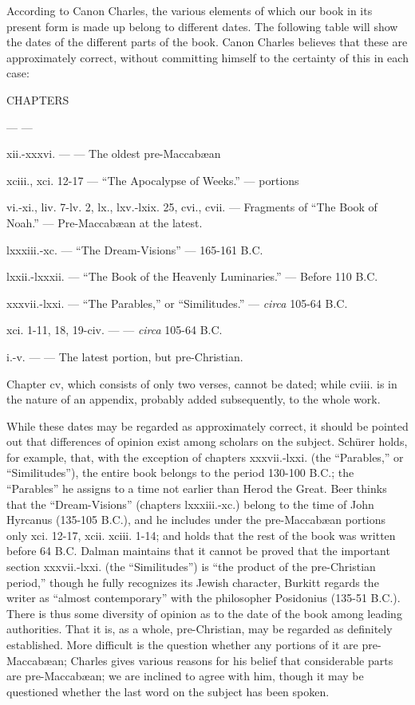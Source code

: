 According to Canon Charles, the various elements
of which our book in its present form is made up
belong to different dates. The following table will
show the dates of the different parts of the book.
Canon Charles believes that these are approximately
correct, without committing himself to the certainty
of this in each case:

CHAPTERS

— —

xii.-xxxvi. — — The oldest pre-Maccabæan

xciii., xci. 12-17 — “The Apocalypse of Weeks.” — portions

vi.-xi., liv. 7-lv. 2, lx., lxv.-lxix. 25, cvi., cvii. — Fragments of “The Book of Noah.” — Pre-Maccabæan at the latest.

lxxxiii.-xc. — “The Dream-Visions” — 165-161 B.C.

lxxii.-lxxxii. — “The Book of the Heavenly Luminaries.” — Before 110 B.C.

xxxvii.-lxxi. — “The Parables,” or “Similitudes.” — \emph{circa} 105-64 B.C.

xci. 1-11, 18, 19-civ. — — \emph{circa} 105-64 B.C.

i.-v. — — The latest portion, but pre-Christian.

Chapter cv, which consists of only two verses,
cannot be dated; while cviii. is in the nature of an
appendix, probably added subsequently, to the whole
work.

While these dates may be regarded as approximately
correct, it should be pointed out that differences
of opinion exist among scholars on the subject.
Schürer holds, for example, that, with the exception
of chapters xxxvii.-lxxi. (the “Parables,” or “Similitudes”),
the entire book belongs to the period
130-100 B.C.; the “Parables” he assigns to a time
not earlier than Herod the Great. Beer thinks that
the “Dream-Visions” (chapters lxxxiii.-xc.) belong
to the time of John Hyrcanus (135-105 B.C.), and he
includes under the pre-Maccabæan portions only
xci. 12-17, xcii. xciii. 1-14; and holds that the rest
of the book was written before 64 B.C. Dalman
maintains that it cannot be proved that the important
section xxxvii.-lxxi. (the “Similitudes”) is “the
product of the pre-Christian period,” though he fully
recognizes its Jewish character, Burkitt regards the
writer as “almost contemporary” with the philosopher
Posidonius (135-51 B.C.). There is thus some
diversity of opinion as to the date of the book among
leading authorities. That it is, as a whole, pre-Christian,
may be regarded as definitely established.
More difficult is the question whether any portions
of it are pre-Maccabæan; Charles gives various
reasons for his belief that considerable parts are pre-Maccabæan;
we are inclined to agree with him,
though it may be questioned whether the last word
on the subject has been spoken.

